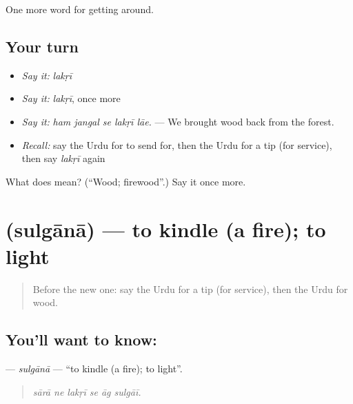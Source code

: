 \begin{grammarlens}[title={What you've built}]
One more word for getting around.
\end{grammarlens}

\subsection*{Your turn}
\begin{itemize}
\raggedright
  \item \emph{Say it:} \emph{lakṛī}
  \item \emph{Say it:} \emph{lakṛī}, once more
  \item \emph{Say it:} \emph{ham jangal se lakṛī lāe.} — We brought wood back from the forest.
  \item \emph{Recall:} say the Urdu for to send for, then the Urdu for a tip (for service), then say \emph{lakṛī} again
\end{itemize}

\begin{tcolorbox}[breakable,colback=teal!4,colframe=teal!35!black,title={Before you move on}]
What does  mean? (\textquotedblleft{}Wood; firewood\textquotedblright{}.) Say it once more.
\end{tcolorbox}
\section[\texorpdfstring{\ur{سلگانا} (sulgānā)}{سلگانا (sulgānā)}]{ (sulgānā) — to kindle (a fire); to light}

\label{lesson:UR-C406-sulgana}



\begin{quote}
Before the new one: say the Urdu for a tip (for service), then the Urdu for wood.
\end{quote}

\subsection*{You'll want to know: }
\textbf{} — \emph{sulgānā} — \textquotedblleft{}to kindle (a fire); to light\textquotedblright{}.

\begin{quote}
     
\end{quote}

\begin{quote}
\emph{sārā ne lakṛī se āg sulgāī.}
\end{quote}

